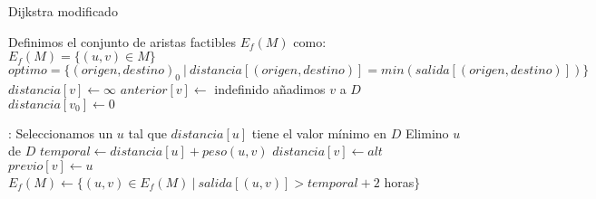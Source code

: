 \begin{algorithm}[H]
\caption{Dijkstra modificado}\label{dijkstra_modificado}
\begin{algorithmic}[1]
\State Definimos el conjunto de aristas factibles $E_{f}(M)$ como: $E_{f}(M) = \{(u,v) \in M\}$
	\State $optimo = \{{(origen, destino)}_{0}\ |\ distancia[(origen, destino)] = min(salida[(origen, destino)])\}$
\Else
		\State $distancia[v] \gets \infty$
		\State $anterior[v] \gets $ indefinido
		\State añadimos $v$ a $D$
	\EndFor
	\State $distancia[v_{0}] \gets 0$
	
	:
		\State Seleccionamos un $u$ tal que $distancia[u]$ tiene el valor mínimo en $D$
		\State Elimino $u$ de $D$
			\State $temporal \gets distancia[u] + peso(u, v)$
				\State $distancia[v] \gets alt$
				\State $previo[v] \gets u$
				\State $E_{f}(M) \gets \{(u, v) \in E_{f}(M)\ |\ salida[(u,v)] > temporal + 2$ horas$\}$
			\EndIf
		\EndFor
	\EndWhile
\EndIf
\EndProcedure
\end{algorithmic}
\end{algorithm}

\newpage
